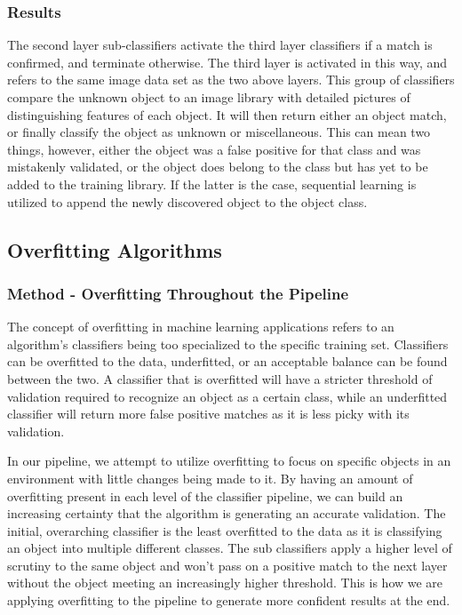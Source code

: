 \documentclass[draftclsnofoot, onecolumn, 10pt, compsoc]{IEEEtran}
\begin{document}
			\subsubsection{Results}
				The second layer sub-classifiers activate the third layer classifiers if a match is confirmed, and terminate otherwise. The third layer is activated in this way, and refers to the same image data set as the two above layers. This group of classifiers compare the unknown object to an image library with detailed pictures of distinguishing features of each object. It will then return either an object match, or finally classify the object as unknown or miscellaneous. This can mean two things, however, either the object was a false positive for that class and was mistakenly validated, or the object does belong to the class but has yet to be added to the training library. If the latter is the case, sequential learning is utilized to append the newly discovered object to the object class.

		\subsection{Overfitting Algorithms}
			\subsubsection{Method - Overfitting Throughout the Pipeline}
				The concept of overfitting in machine learning applications refers to an algorithm’s classifiers being too specialized to the specific training set. Classifiers can be overfitted to the data, underfitted, or an acceptable balance can be found between the two. A classifier that is overfitted will have a stricter threshold of validation required to recognize an object as a certain class, while an underfitted classifier will return more false positive matches as it is less picky with its validation.

				In our pipeline, we attempt to utilize overfitting to focus on specific objects in an environment with little changes being made to it. By having an amount of overfitting present in each level of the classifier pipeline, we can build an increasing certainty that the algorithm is generating an accurate validation. The initial, overarching classifier is the least overfitted to the data as it is classifying an object into multiple different classes. The sub classifiers apply a higher level of scrutiny to the same object and won’t pass on a positive match to the next layer without the object meeting an increasingly higher threshold. This is how we are applying overfitting to the pipeline to generate more confident results at the end.
\end{document}
